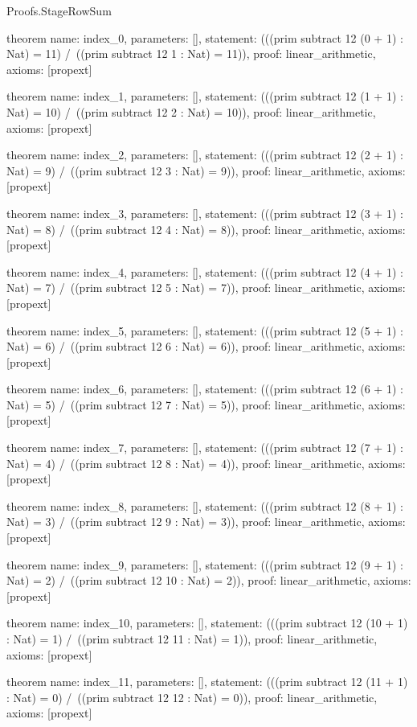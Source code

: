 \begin{lexlean}{Proofs.StageRowSum}
\begin{semanticmodule}
theorem{
  name: index_0,
  parameters: [],
  statement: (((prim subtract 12 (0 + 1) : Nat) = 11) /\ ((prim subtract 12 1 : Nat) = 11)),
  proof: linear_arithmetic{},
  axioms: [propext]
}

theorem{
  name: index_1,
  parameters: [],
  statement: (((prim subtract 12 (1 + 1) : Nat) = 10) /\ ((prim subtract 12 2 : Nat) = 10)),
  proof: linear_arithmetic{},
  axioms: [propext]
}

theorem{
  name: index_2,
  parameters: [],
  statement: (((prim subtract 12 (2 + 1) : Nat) = 9) /\ ((prim subtract 12 3 : Nat) = 9)),
  proof: linear_arithmetic{},
  axioms: [propext]
}

theorem{
  name: index_3,
  parameters: [],
  statement: (((prim subtract 12 (3 + 1) : Nat) = 8) /\ ((prim subtract 12 4 : Nat) = 8)),
  proof: linear_arithmetic{},
  axioms: [propext]
}

theorem{
  name: index_4,
  parameters: [],
  statement: (((prim subtract 12 (4 + 1) : Nat) = 7) /\ ((prim subtract 12 5 : Nat) = 7)),
  proof: linear_arithmetic{},
  axioms: [propext]
}

theorem{
  name: index_5,
  parameters: [],
  statement: (((prim subtract 12 (5 + 1) : Nat) = 6) /\ ((prim subtract 12 6 : Nat) = 6)),
  proof: linear_arithmetic{},
  axioms: [propext]
}

theorem{
  name: index_6,
  parameters: [],
  statement: (((prim subtract 12 (6 + 1) : Nat) = 5) /\ ((prim subtract 12 7 : Nat) = 5)),
  proof: linear_arithmetic{},
  axioms: [propext]
}

theorem{
  name: index_7,
  parameters: [],
  statement: (((prim subtract 12 (7 + 1) : Nat) = 4) /\ ((prim subtract 12 8 : Nat) = 4)),
  proof: linear_arithmetic{},
  axioms: [propext]
}

theorem{
  name: index_8,
  parameters: [],
  statement: (((prim subtract 12 (8 + 1) : Nat) = 3) /\ ((prim subtract 12 9 : Nat) = 3)),
  proof: linear_arithmetic{},
  axioms: [propext]
}

theorem{
  name: index_9,
  parameters: [],
  statement: (((prim subtract 12 (9 + 1) : Nat) = 2) /\ ((prim subtract 12 10 : Nat) = 2)),
  proof: linear_arithmetic{},
  axioms: [propext]
}

theorem{
  name: index_10,
  parameters: [],
  statement: (((prim subtract 12 (10 + 1) : Nat) = 1) /\ ((prim subtract 12 11 : Nat) = 1)),
  proof: linear_arithmetic{},
  axioms: [propext]
}

theorem{
  name: index_11,
  parameters: [],
  statement: (((prim subtract 12 (11 + 1) : Nat) = 0) /\ ((prim subtract 12 12 : Nat) = 0)),
  proof: linear_arithmetic{},
  axioms: [propext]
}


\end{semanticmodule}
\end{lexlean}
